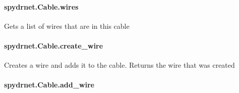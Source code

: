 \documentclass[letterpaper,10pt,english,openany,oneside]{sphinxmanual}
\begin{document}
\paragraph{spydrnet.Cable.wires}
\label{\detokenize{reference/classes/generated/spydrnet.Cable.wires:spydrnet-cable-wires}}\label{\detokenize{reference/classes/generated/spydrnet.Cable.wires::doc}}

\begin{fulllineitems}
\label{\detokenize{reference/classes/generated/spydrnet.Cable.wires:spydrnet.Cable.wires}}
Gets a list of wires that are in this cable

\end{fulllineitems}



\paragraph{spydrnet.Cable.create\_wire}
\label{\detokenize{reference/classes/generated/spydrnet.Cable.create_wire:spydrnet-cable-create-wire}}\label{\detokenize{reference/classes/generated/spydrnet.Cable.create_wire::doc}}

\begin{fulllineitems}
\label{\detokenize{reference/classes/generated/spydrnet.Cable.create_wire:spydrnet.Cable.create_wire}}
Creates a wire and adds it to the cable. Returns the wire that was created

\end{fulllineitems}



\paragraph{spydrnet.Cable.add\_wire}
\label{\detokenize{reference/classes/generated/spydrnet.Cable.add_wire:spydrnet-cable-add-wire}}\label{\detokenize{reference/classes/generated/spydrnet.Cable.add_wire::doc}}
\end{document}

